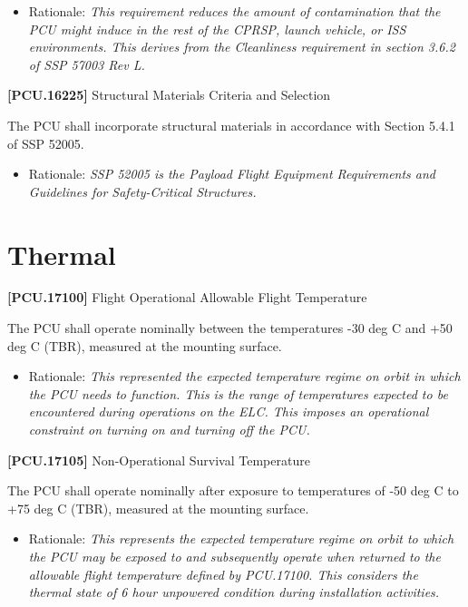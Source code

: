 \documentclass[12pt,oneside,oldfontcommands]{memoir}
\begin{document}
\begin{itemize}
\item{} Rationale: \emph{This requirement reduces the amount of contamination that the PCU might induce in the rest of the CPRSP, launch vehicle, or ISS environments. This derives from the Cleanliness requirement in section 3.6.2 of SSP 57003 Rev L.}

\end{itemize}

\textbf{[PCU.16225]} Structural Materials Criteria and Selection

The \gls{PCU} shall incorporate structural materials in accordance with Section 5.4.1 of SSP 52005.

\begin{itemize}
\item{} Rationale: \emph{SSP 52005 is the Payload Flight Equipment Requirements and Guidelines for Safety-Critical Structures.}

\end{itemize}

\section{Thermal}
\label{thermal}

\textbf{[PCU.17100]} Flight Operational Allowable Flight Temperature

The \gls{PCU} shall operate nominally between the temperatures -30 deg C and +50 deg C (TBR\label{tbx_19}), measured at the mounting surface.

\begin{itemize}
\item{} Rationale: \emph{This represented the expected temperature regime on orbit in which the PCU needs to function. This is the range of temperatures expected to be encountered during operations on the ELC. This imposes an operational constraint on turning on and turning off the PCU.}

\end{itemize}

\textbf{[PCU.17105]} Non-Operational Survival Temperature

The \gls{PCU} shall operate nominally after exposure to temperatures of -50 deg C to +75 deg C (TBR\label{tbx_20}), measured at the mounting surface.

\begin{itemize}
\item{} Rationale: \emph{This represents the expected temperature regime on orbit to which the PCU may be exposed to and subsequently operate when returned to the allowable flight temperature defined by PCU.17100. This considers the thermal state of 6 hour unpowered condition during installation activities.}

\end{itemize}
\end{document}
